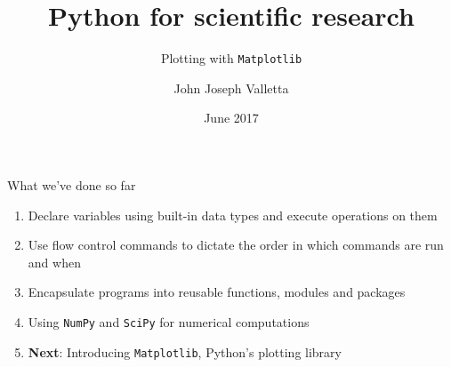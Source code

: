 \documentclass[pdf]{beamer}
\title[Python for scientific research]{Python for scientific research}
\subtitle{Plotting with \texttt{Matplotlib}}
\author{John Joseph Valletta}
\date[June 2017]{June 2017}
\institute[]{University of Exeter, Penryn Campus, UK}
\begin{document}
\begin{frame}
\titlepage
\end{frame}

\begin{frame}{What we've done so far}

	\begin{enumerate}\addtolength{\itemsep}{1\baselineskip}
		\item Declare variables using built-in data types and execute operations
		on them
		\item Use flow control commands to dictate the order in which commands are run
		and when
		\item Encapsulate programs into reusable functions, modules and packages
		\item Using \texttt{NumPy} and \texttt{SciPy} for numerical computations
		\item \textbf{Next}: Introducing \texttt{Matplotlib}, Python's plotting library
	\end{enumerate}

\end{frame}
\end{document}

